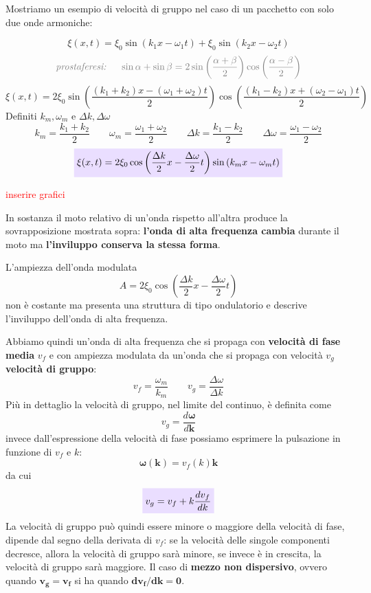 \documentclass[x11names]{article}
\newcommand{\viola}[1]{\colorbox{myred}{$\displaystyle #1$}}
\begin{document}
		\noindent
		Mostriamo un esempio di velocità di gruppo nel caso di un pacchetto con solo due onde armoniche:
		
		\[ 
		\xi(x,t) = \xi_0\sin\left(k_1x -\omega_1 t\right) + \xi_0\sin\left(k_2x -\omega_2 t\right)
		\]
		\[ 
		\textcolor{gray}{\textit{prostaferesi: } \quad \sin\alpha + \sin\beta = 2\sin\left(\frac{\alpha + \beta}{2}\right)\cos\left(\frac{\alpha - \beta}{2}\right)}
		\]
		\[ 
		\xi(x,t) = 2\xi_0\sin\left(\frac{(k_1 + k_2)x - (\omega_1 + \omega_2)t}{2}\right) \cos\left(\frac{(k_1 - k_2)x + (\omega_2 - \omega_1)t}{2}\right)
		\]
		Definiti \(k_m,\omega _m\) e \(\Delta k,\Delta\omega\)
		\[ 
		\boxed{k_m = \frac{k_1 + k_2}{2}} \qquad \boxed{\omega _m = \frac{\omega _1 + \omega _2}{2}} \qquad \boxed{\Delta k=\frac{k_1 - k_2}{2}} \qquad \boxed{\Delta \omega = \frac{\omega_1 - \omega_2}{2}}
		\]
		\[ 
		\viola{\xi(x,t) = 2\xi_0\cos\left(\frac{\Delta k}{2}x - \frac{\Delta\omega}{2}t \right)\sin\left(k_mx - \omega_mt\right)}
		\]
		\begin{center}
			\textcolor{red}{inserire grafici}
		\end{center}	
	
		In sostanza il moto relativo di un'onda rispetto all'altra produce la sovrapposizione mostrata sopra: \textbf{l'onda di alta frequenza cambia} durante il moto ma \textbf{l'inviluppo conserva la stessa forma}.
		
		L'ampiezza dell'onda modulata
		\[ 
		A = 2\xi_0\cos\left(\frac{\Delta k}{2}x - \frac{\Delta\omega}{2}t \right)
		\]
		non è costante ma presenta una struttura di tipo ondulatorio e descrive l'inviluppo dell'onda di alta frequenza.
		
		Abbiamo quindi un'onda di alta frequenza che si propaga con \textbf{velocità di fase media} \(v_f\) e con ampiezza modulata da un'onda che si propaga con velocità \(v_g\) \textbf{velocità di gruppo}:
		\[ 
		v_f = \frac{\omega _m}{k_m} \qquad v_g = \frac{\Delta \omega }{\Delta k}
		\]
		Più in dettaglio la velocità di gruppo, nel limite del continuo, è definita come 
		\[ 
		v_g = \frac{d\boldsymbol{\omega} }{d\boldsymbol{k}}
		\]
		invece dall'espressione della velocità di fase possiamo esprimere la pulsazione in funzione di \(v_f\) e \(k\):
		\[ 
		\boldsymbol{\omega (k)} = v_f(k)\boldsymbol{k}
		\]
		da cui
		\begin{equation}\label{relazione di dispersione}
			\viola{v_g = v_f + k\frac{dv_f}{dk}} 
		\end{equation}
		La velocità di gruppo può quindi essere minore o maggiore della velocità di fase, dipende dal segno della derivata di \(v_f\): se la velocità delle singole componenti decresce, allora la velocità di gruppo sarà minore, se invece è in crescita, la velocità di gruppo sarà maggiore. Il caso di \textbf{mezzo non dispersivo}, ovvero quando \(\boldsymbol{v_g = v_f}\) si ha quando \(\boldsymbol{dv_f/dk = 0}\).
\end{document}
